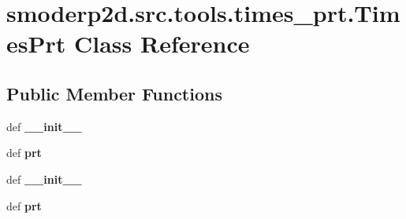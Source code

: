 \hypertarget{classsmoderp2d_1_1src_1_1tools_1_1times__prt_1_1TimesPrt}{\section{smoderp2d.\-src.\-tools.\-times\-\_\-prt.\-Times\-Prt Class Reference}
\label{classsmoderp2d_1_1src_1_1tools_1_1times__prt_1_1TimesPrt}
}
\subsection*{Public Member Functions}
\begin{DoxyCompactItemize}
\item 
\hypertarget{classsmoderp2d_1_1src_1_1tools_1_1times__prt_1_1TimesPrt_a5e31ebdc20a63410a700b37e28145aaa}{def {\bfseries \-\_\-\-\_\-init\-\_\-\-\_\-}}\label{classsmoderp2d_1_1src_1_1tools_1_1times__prt_1_1TimesPrt_a5e31ebdc20a63410a700b37e28145aaa}

\item 
\hypertarget{classsmoderp2d_1_1src_1_1tools_1_1times__prt_1_1TimesPrt_a9bdc7e120830fe25329f92cdc8bef5f1}{def {\bfseries prt}}\label{classsmoderp2d_1_1src_1_1tools_1_1times__prt_1_1TimesPrt_a9bdc7e120830fe25329f92cdc8bef5f1}

\item 
\hypertarget{classsmoderp2d_1_1src_1_1tools_1_1times__prt_1_1TimesPrt_a5e31ebdc20a63410a700b37e28145aaa}{def {\bfseries \-\_\-\-\_\-init\-\_\-\-\_\-}}\label{classsmoderp2d_1_1src_1_1tools_1_1times__prt_1_1TimesPrt_a5e31ebdc20a63410a700b37e28145aaa}

\item 
\hypertarget{classsmoderp2d_1_1src_1_1tools_1_1times__prt_1_1TimesPrt_a9bdc7e120830fe25329f92cdc8bef5f1}{def {\bfseries prt}}\label{classsmoderp2d_1_1src_1_1tools_1_1times__prt_1_1TimesPrt_a9bdc7e120830fe25329f92cdc8bef5f1}

\end{DoxyCompactItemize}
